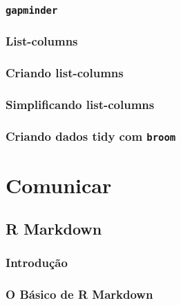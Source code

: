\documentclass[
]{latex/krantz}
\theoremstyle{definition}
\theoremstyle{definition}
\theoremstyle{definition}
\theoremstyle{definition}
\theoremstyle{remark}
\begin{document}
\hypertarget{gapminder}{%
\section{\texorpdfstring{\texttt{gapminder}}{gapminder}}\label{gapminder}}

\hypertarget{list-columns}{%
\section{List-columns}\label{list-columns}}

\hypertarget{criando-list-columns}{%
\section{Criando list-columns}\label{criando-list-columns}}

\hypertarget{simplificando-list-columns}{%
\section{Simplificando list-columns}\label{simplificando-list-columns}}

\hypertarget{criando-dados-tidy-com-broom}{%
\section{\texorpdfstring{Criando dados tidy com \texttt{broom}}{Criando dados tidy com broom}}\label{criando-dados-tidy-com-broom}}

\hypertarget{part-comunicar}{%
\part{Comunicar}\label{part-comunicar}}

\hypertarget{r-markdown}{%
\chapter{R Markdown}\label{r-markdown}}

\hypertarget{introduuxe7uxe3o-17}{%
\section{Introdução}\label{introduuxe7uxe3o-17}}

\hypertarget{o-buxe1sico-de-r-markdown}{%
\section{O Básico de R Markdown}\label{o-buxe1sico-de-r-markdown}}
\end{document}
